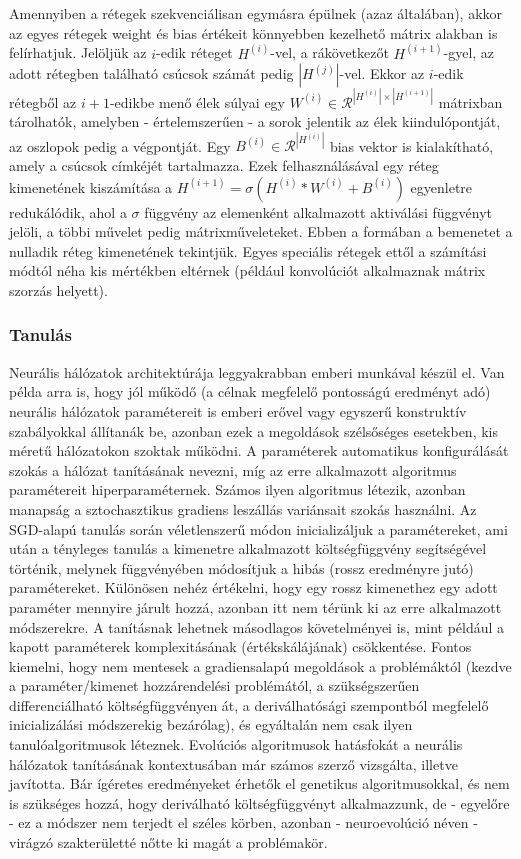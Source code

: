 Amennyiben a rétegek szekvenciálisan egymásra épülnek (azaz általában), akkor az egyes rétegek weight és bias értékeit könnyebben kezelhető mátrix alakban is felírhatjuk. Jelöljük az $i$-edik réteget $H^{(i)}$-vel, a rákövetkezőt $H^{(i+1)}$-gyel, az adott rétegben található csúcsok számát pedig $|H^{(j)}|$-vel. Ekkor az $i$-edik rétegből az $i+1$-edikbe menő élek súlyai egy $W^{(i)} \in  \mathcal{R}^{|H^{(i)}|\times|H^{(i+1)}|}$ mátrixban tárolhatók, amelyben - értelemszerűen - a sorok jelentik az élek kiindulópontját, az oszlopok pedig a végpontját. Egy $B^{(i)} \in \mathcal{R}^{|H^{(i)}|}$ bias vektor is kialakítható, amely a csúcsok címkéjét tartalmazza. Ezek felhasználásával egy réteg kimenetének kiszámítása a $H^{(i+1)} = \sigma(H^{(i)} * W^{(i)} + B^{(i)})$ egyenletre redukálódik, ahol a $\sigma$ függvény az elemenként alkalmazott aktiválási függvényt jelöli, a többi művelet pedig mátrixműveleteket. Ebben a formában a bemenetet a nulladik réteg kimenetének tekintjük. Egyes speciális rétegek ettől a számítási módtól néha kis mértékben eltérnek (például konvolúciót alkalmaznak mátrix szorzás helyett).

\subsubsection{Tanulás}

Neurális hálózatok architektúrája leggyakrabban emberi munkával készül el. Van példa arra is, hogy jól működő (a célnak megfelelő pontosságú eredményt adó) neurális hálózatok paramétereit is emberi erővel vagy egyszerű konstruktív szabályokkal állítanák be, azonban ezek a megoldások szélsőséges esetekben, kis méretű hálózatokon szoktak működni. A paraméterek automatikus konfigurálását szokás a hálózat tanításának nevezni, míg az erre alkalmazott algoritmus paramétereit hiperparaméternek.
Számos ilyen algoritmus létezik, azonban manapság a sztochasztikus gradiens leszállás variánsait szokás használni. Az SGD-alapú tanulás során véletlenszerű módon inicializáljuk a paramétereket, ami után a tényleges tanulás a kimenetre alkalmazott költségfüggvény segítségével történik, melynek függvényében módosítjuk a hibás (rossz eredményre jutó) paramétereket. Különösen nehéz értékelni, hogy egy rossz kimenethez egy adott paraméter mennyire járult hozzá, azonban itt nem térünk ki az erre alkalmazott módszerekre. A tanításnak lehetnek másodlagos követelményei is, mint például a kapott paraméterek komplexitásának (értékskálájának) csökkentése. Fontos kiemelni, hogy nem mentesek a gradiensalapú megoldások a problémáktól (kezdve a paraméter/kimenet hozzárendelési problémától, a szükségszerűen differenciálható költségfüggvényen át, a deriválhatósági szempontból megfelelő inicializálási módszerekig bezárólag), és egyáltalán nem csak ilyen tanulóalgoritmusok léteznek. Evolúciós algoritmusok hatásfokát a neurális hálózatok tanításának kontextusában már számos szerző vizsgálta, illetve javította\cite{ann_ga, ann_ga2}. Bár ígéretes eredményeket érhetők el genetikus algoritmusokkal, és nem is szükséges hozzá, hogy deriválható költségfüggvényt alkalmazzunk, de - egyelőre - ez a módszer nem terjedt el széles körben, azonban - neuroevolúció néven - virágzó szakterületté nőtte ki magát a problémakör.

